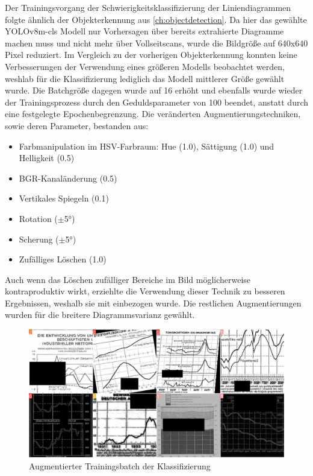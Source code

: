 Der Trainingsvorgang der Schwierigkeitsklassifizierung der Liniendiagrammen folgte ähnlich der Objekterkennung aus \ref{ch:objectdetection}. Da hier das gewählte YOLOv8m-cls Modell nur Vorhersagen über bereits extrahierte Diagramme machen muss und nicht mehr über Vollseitscans, wurde die Bildgröße auf 640x640 Pixel reduziert. Im Vergleich zu der vorherigen Objekterkennung konnten keine Verbesserungen der Verwendung eines größeren Modells beobachtet werden, weshlab für die Klassifizierung lediglich das Modell mittlerer Größe gewählt wurde. Die Batchgröße dagegen wurde auf 16 erhöht und ebenfalls wurde wieder der Trainingsprozess durch den Geduldsparameter von 100 beendet, anstatt durch eine festgelegte Epochenbegrenzung. Die veränderten Augmentierungstechniken, sowie deren Parameter, bestanden aus:

\begin{itemize}[itemsep=0pt, topsep=0pt]
    \item Farbmanipulation im HSV-Farbraum: Hue (1.0), Sättigung (1.0) und Helligkeit (0.5)
    \item BGR-Kanaländerung (0.5)
    \item Vertikales Spiegeln (0.1)
    \item Rotation ($\pm$5°)
    \item Scherung ($\pm$5°)
    \item Zufälliges Löschen (1.0)
\end{itemize}

Auch wenn das Löschen zufälliger Bereiche im Bild möglicherweise kontraproduktiv wirkt, erziehlte die Verwendung dieser Technik zu besseren Ergebnissen, weshalb sie mit einbezogen wurde. Die restlichen Augmentierungen wurden für die breitere Diagrammsvarianz gewählt.

\begin{figure}[h!]
    \centering
    \captionsetup{width=.75\linewidth}
    \includegraphics[width=.75\textwidth]{Implementation/img/classify_train_batch.jpg}
    \caption{ Augmentierter Trainingsbatch der Klassifizierung}
    \label{fig:classify_train_batch}
\end{figure}

